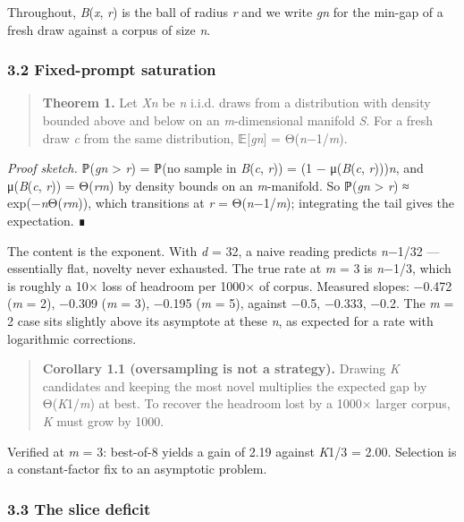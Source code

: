 \documentclass[
  11pt,
]{article}
\theoremstyle{plain}
\theoremstyle{definition}
\begin{document}
Throughout, \emph{B}(\emph{x}, \emph{r}) is the ball of radius \emph{r}
and we write \emph{gn} for the min-gap of a fresh draw against a corpus
of size \emph{n}.

\subsubsection{3.2 Fixed-prompt
saturation}\label{32-fixed-prompt-saturation}

\begin{quote}
\textbf{Theorem 1.} Let \emph{Xn} be \emph{n} i.i.d. draws from a
distribution with density bounded above and below on an
\emph{m}-dimensional manifold \emph{S}. For a fresh draw \emph{c} from
the same distribution, 𝔼{[}\emph{gn}{]} = Θ(\emph{n}−1/\emph{m}).
\end{quote}

\emph{Proof sketch.} ℙ(\emph{gn} \textgreater{} \emph{r}) = ℙ(no sample
in \emph{B}(\emph{c}, \emph{r})) = (1 − μ(\emph{B}(\emph{c},
\emph{r})))\emph{n}, and μ(\emph{B}(\emph{c}, \emph{r})) =
Θ(\emph{r}\emph{m}) by density bounds on an \emph{m}-manifold. So
ℙ(\emph{gn} \textgreater{} \emph{r}) ≈ exp(−\emph{n}Θ(\emph{rm})), which
transitions at \emph{r} = Θ(\emph{n}−1/\emph{m}); integrating the tail
gives the expectation. ∎

The content is the exponent. With \emph{d} = 32, a naive reading
predicts \emph{n}−1/32 --- essentially flat, novelty never exhausted.
The true rate at \emph{m} = 3 is \emph{n}−1/3, which is roughly a 10×
loss of headroom per 1000× of corpus. Measured slopes: −0.472 (\emph{m}
= 2), −0.309 (\emph{m} = 3), −0.195 (\emph{m} = 5), against −0.5,
−0.333, −0.2. The \emph{m} = 2 case sits slightly above its asymptote at
these \emph{n}, as expected for a rate with logarithmic corrections.

\begin{quote}
\textbf{Corollary 1.1 (oversampling is not a strategy).} Drawing
\emph{K} candidates and keeping the most novel multiplies the expected
gap by Θ(\emph{K}1/\emph{m}) at best. To recover the headroom lost by a
1000× larger corpus, \emph{K} must grow by 1000.
\end{quote}

Verified at \emph{m} = 3: best-of-8 yields a gain of 2.19 against
\emph{K}1/3 = 2.00. Selection is a constant-factor fix to an asymptotic
problem.

\subsubsection{3.3 The slice deficit}\label{33-the-slice-deficit}
\end{document}
